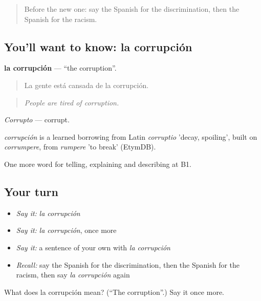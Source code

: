 \label{lesson:ES-C605-corrupcion}



\begin{quote}
Before the new one: say the Spanish for the discrimination, then the Spanish for the racism.
\end{quote}

\subsection*{You'll want to know: la corrupción}
\textbf{la corrupción} — \textquotedblleft{}the corruption\textquotedblright{}.

\begin{quote}
La gente está cansada de la corrupción.
\end{quote}

\begin{quote}
\emph{People are tired of corruption.}
\end{quote}

\emph{Corrupto} — corrupt.

\begin{cousinweb}
\emph{corrupción} is a learned borrowing from Latin \emph{corruptio} 'decay, spoiling', built on \emph{corrumpere}, from \emph{rumpere} 'to break' (EtymDB).
\end{cousinweb}

\begin{grammarlens}[title={What you've built}]
One more word for telling, explaining and describing at B1.
\end{grammarlens}

\subsection*{Your turn}
\begin{itemize}
\raggedright
  \item \emph{Say it:} \emph{la corrupción}
  \item \emph{Say it:} \emph{la corrupción}, once more
  \item \emph{Say it:} a sentence of your own with \emph{la corrupción}
  \item \emph{Recall:} say the Spanish for the discrimination, then the Spanish for the racism, then say \emph{la corrupción} again
\end{itemize}

\begin{tcolorbox}[breakable,colback=teal!4,colframe=teal!35!black,title={Before you move on}]
What does la corrupción mean? (\textquotedblleft{}The corruption\textquotedblright{}.) Say it once more.
\end{tcolorbox}
